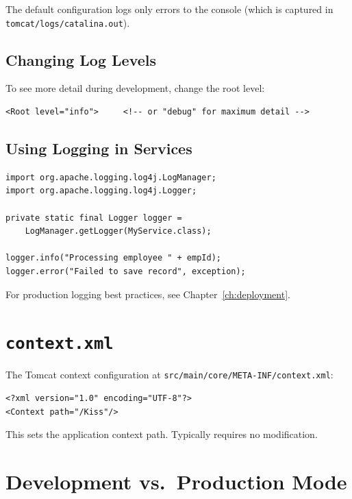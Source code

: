 \noindent
The default configuration logs only errors to the console (which is captured in \texttt{tomcat/logs/catalina.out}).

\subsection{Changing Log Levels}

To see more detail during development, change the root level:

\begin{lstlisting}[style=html]
<Root level="info">     <!-- or "debug" for maximum detail -->
\end{lstlisting}

\subsection{Using Logging in Services}

\begin{lstlisting}[style=java]
import org.apache.logging.log4j.LogManager;
import org.apache.logging.log4j.Logger;

private static final Logger logger =
    LogManager.getLogger(MyService.class);

logger.info("Processing employee " + empId);
logger.error("Failed to save record", exception);
\end{lstlisting}

\noindent
For production logging best practices, see Chapter~\ref{ch:deployment}.

\section{\texttt{context.xml}}
\label{sec:config-context}

The Tomcat context configuration at \texttt{src/main/core/META-INF/context.xml}:

\begin{lstlisting}[style=html]
<?xml version="1.0" encoding="UTF-8"?>
<Context path="/Kiss"/>
\end{lstlisting}

\noindent
This sets the application context path.  Typically requires no modification.

\section{Development vs.\ Production Mode}
\label{sec:config-devprod}

